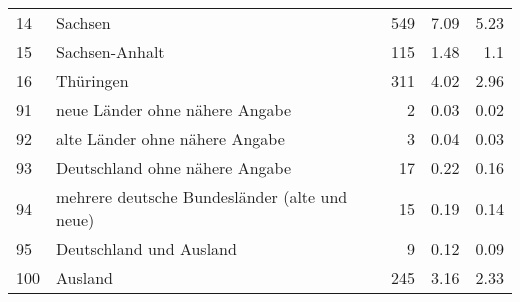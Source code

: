 \begin{longtable}{lXrrr}
        14 & \multicolumn{1}{X}{Sachsen} & %
          \num{549} &
          \num[round-mode=places,round-precision=2]{7.09} &
          \num[round-mode=places,round-precision=2]{5.23} \\

        15 & \multicolumn{1}{X}{Sachsen-Anhalt} & %
          \num{115} &
          \num[round-mode=places,round-precision=2]{1.48} &
          \num[round-mode=places,round-precision=2]{1.1} \\

        16 & \multicolumn{1}{X}{Thüringen} & %
          \num{311} &
          \num[round-mode=places,round-precision=2]{4.02} &
          \num[round-mode=places,round-precision=2]{2.96} \\

        91 & \multicolumn{1}{X}{neue Länder ohne nähere Angabe} & %
          \num{2} &
          \num[round-mode=places,round-precision=2]{0.03} &
          \num[round-mode=places,round-precision=2]{0.02} \\

        92 & \multicolumn{1}{X}{alte Länder ohne nähere Angabe} & %
          \num{3} &
          \num[round-mode=places,round-precision=2]{0.04} &
          \num[round-mode=places,round-precision=2]{0.03} \\

        93 & \multicolumn{1}{X}{Deutschland ohne nähere Angabe} & %
          \num{17} &
          \num[round-mode=places,round-precision=2]{0.22} &
          \num[round-mode=places,round-precision=2]{0.16} \\

        94 & \multicolumn{1}{X}{mehrere deutsche Bundesländer (alte und neue)} & %
          \num{15} &
          \num[round-mode=places,round-precision=2]{0.19} &
          \num[round-mode=places,round-precision=2]{0.14} \\

        95 & \multicolumn{1}{X}{Deutschland und Ausland} & %
          \num{9} &
          \num[round-mode=places,round-precision=2]{0.12} &
          \num[round-mode=places,round-precision=2]{0.09} \\

        100 & \multicolumn{1}{X}{Ausland} & %
          \num{245} &
          \num[round-mode=places,round-precision=2]{3.16} &
          \num[round-mode=places,round-precision=2]{2.33} \\


\end{longtable}
